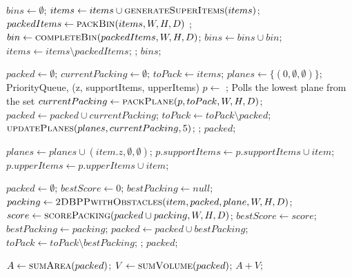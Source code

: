 \documentclass{article}
\begin{document}
\begin{algorithmic}
        \State $bins \gets \emptyset$;
        \State $items \gets items \cup \Call{generateSuperItems}{items}$;
        \Repeat
            \State $packedItems \gets \Call{packBin}{items, W, H, D}$ ;
            \State $bin \gets \Call{completeBin}{packedItems, W, H, D}$;
            \State $bins \gets bins \cup bin$; 
            \State $items \gets items \setminus packedItems$;
        ;
        \State \Return $bins$;
    \EndFunction
    \vspace{1cm}

        \State $packed \gets \emptyset$;
        \State $currentPacking \gets \emptyset$;
        \State $toPack \gets items$;
        \State $planes \gets \{ (0, \emptyset, \emptyset) \}$; \Comment PriorityQueue, (z, supportItems, upperItems)
        \Repeat
            \State $p \gets $ ; \Comment Polls the lowest plane from the set
            \State $currentPacking \gets \Call{packPlane}{p, toPack, W, H, D}$;
            \State $packed \gets packed \cup currentPacking$;
            \State $toPack \gets toPack \setminus packed$;
            \State $\Call{updatePlanes}{planes, currentPacking, 5}$;
        ;
        \State \Return $packed$;
    \EndFunction
    \vspace{1cm}

                \State $planes \gets planes \cup (item.z, \emptyset, \emptyset)$;
            \EndIf
                \State $p.supportItems \gets p.supportItems \cup item$;
            \EndFor
                \State $p.upperItems \gets p.upperItems \cup item$;
            \EndFor
        \EndFor
    \EndProcedure
    \newpage

        \State $packed \gets \emptyset$;
        \Repeat
            \State $bestScore \gets 0$;
            \State $bestPacking \gets null$;
                \State $packing \gets \Call{2DBPPwithObstacles}{item, packed, plane, W, H, D}$;
                \State $score \gets \Call{scorePacking}{packed \cup packing, W, H, D}$;
                    \State $bestScore \gets score$;
                    \State $bestPacking \gets packing$;
                \EndIf
            \EndFor
            \State $packed \gets packed \cup bestPacking$;
            \State $toPack \gets toPack \setminus bestPacking$;
        ;
        \State \Return $packed$;
    \EndFunction
    \vspace{1cm}

        \State $A \gets \Call{sumArea}{packed}$;
        \State $V \gets \Call{sumVolume}{packed}$;
        \State \Return $A + V$;
    \EndFunction
\end{algorithmic}
\end{document}
